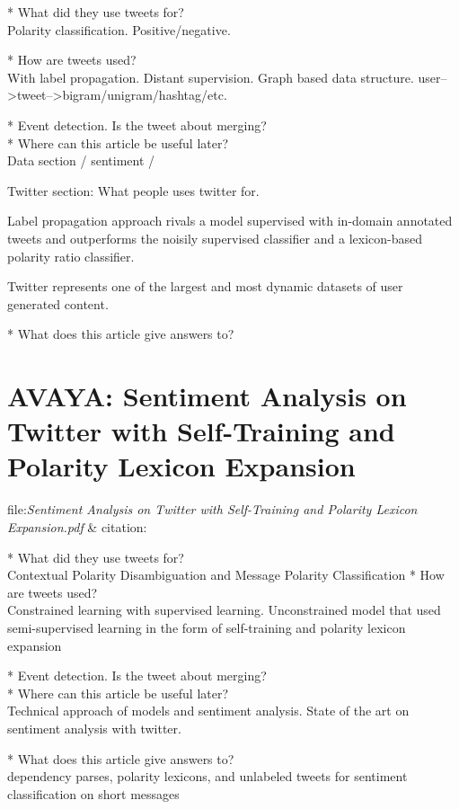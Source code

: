 * What did they use tweets for?\\
Polarity classification. Positive/negative. 

* How are tweets used?\\
With label propagation.
Distant supervision. 
Graph based data structure. 
user-->tweet-->bigram/unigram/hashtag/etc.  

* Event detection. Is the tweet about merging? \\
* Where can this article be useful later? \\
Data section / sentiment / 

Twitter section: What people uses twitter for. 

Label propagation approach rivals a model supervised with in-domain annotated tweets and outperforms the noisily supervised classifier and a lexicon-based polarity ratio classifier. \cite[]{sperious11}

Twitter represents one of the largest and most dynamic datasets of user
generated content.


* What does this article give answers to?\\


\section{AVAYA: Sentiment Analysis on Twitter with Self-Training and Polarity Lexicon Expansion}
file:\textit{Sentiment Analysis on Twitter with Self-Training and Polarity
Lexicon Expansion.pdf} & citation:\cite[]{becker13}

* What did they use tweets for?\\
Contextual Polarity Disambiguation and Message Polarity Classiﬁcation
* How are tweets used?\\
Constrained learning with supervised learning. 
Unconstrained model that used semi-supervised learning in the form of self-training and polarity lexicon expansion

* Event detection. Is the tweet about merging? \\
* Where can this article be useful later? \\
Technical approach of models and sentiment analysis.
State of the art on sentiment analysis with twitter. 

* What does this article give answers to?\\
dependency parses, polarity lexicons,
and unlabeled tweets for sentiment classification on
short messages

